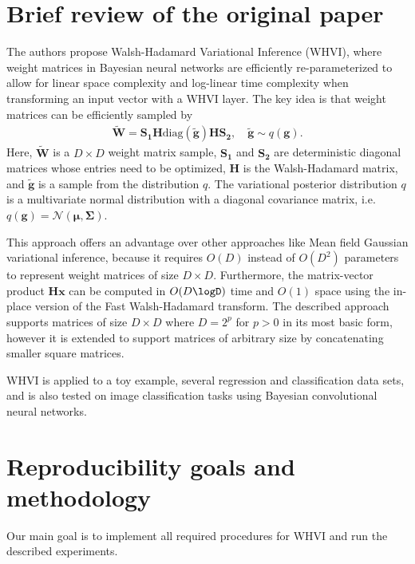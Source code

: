 \documentclass[11pt]{article}
\begin{document}
    \section{Brief review of the original paper}\label{sec:brief-review-of-the-paper}
    The authors propose Walsh-Hadamard Variational Inference (WHVI), where weight matrices in Bayesian neural networks are efficiently re-parameterized to allow for linear space complexity and log-linear time complexity when transforming an input vector with a WHVI layer.
    The key idea is that weight matrices can be efficiently sampled by
    \begin{align}
        \widetilde{\mathbf{W}} = \mathbf{S_1} \mathbf{H} \mathrm{diag}(\widetilde{\mathbf{g}}) \mathbf{H} \mathbf{S_2},\quad\widetilde{\mathbf{g}} \sim q(\mathbf{g}).
        \label{eqn:weight-sampling}
    \end{align}
    Here, $\widetilde{\mathbf{W}}$ is a $D \times D$ weight matrix sample, $\mathbf{S_1}$ and $\mathbf{S_2}$ are deterministic diagonal matrices whose entries need to be optimized, $\mathbf{H}$ is the Walsh-Hadamard matrix, and $\widetilde{\mathbf{g}}$ is a sample from the distribution $q$.
    The variational posterior distribution $q$ is a multivariate normal distribution with a diagonal covariance matrix, i.e.\ $q(\mathbf{g}) = \mathcal{N}(\mathbf{\mu}, \mathbf{\Sigma})$.

    This approach offers an advantage over other approaches like Mean field Gaussian variational inference, because it requires $O(D)$ instead of $O(D^2)$ parameters to represent weight matrices of size $D \times D$.
    Furthermore, the matrix-vector product $\mathbf{Hx}$ can be computed in $O(D \logD)$ time and $O(1)$ space using the in-place version of the Fast Walsh-Hadamard transform.
    The described approach supports matrices of size $D \times D$ where $D = 2^p$ for $p > 0$ in its most basic form, however it is extended to support matrices of arbitrary size by concatenating smaller square matrices.

    WHVI is applied to a toy example, several regression and classification data sets, and is also tested on image classification tasks using Bayesian convolutional neural networks.

    \section{Reproducibility goals and methodology}\label{sec:reproducibility-goals}
    Our main goal is to implement all required procedures for WHVI and run the described experiments.
\end{document}
